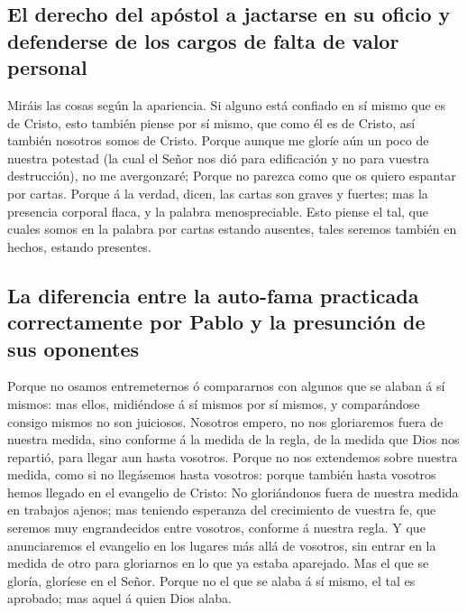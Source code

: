 \hypertarget{el-derecho-del-apuxf3stol-a-jactarse-en-su-oficio-y-defenderse-de-los-cargos-de-falta-de-valor-personal}{%
\subsection{El derecho del apóstol a jactarse en su oficio y defenderse
de los cargos de falta de valor
personal}\label{el-derecho-del-apuxf3stol-a-jactarse-en-su-oficio-y-defenderse-de-los-cargos-de-falta-de-valor-personal}}

 Miráis las cosas según la apariencia. Si alguno está
confiado en sí mismo que es de Cristo, esto también piense por sí mismo,
que como él es de Cristo, así también nosotros somos de Cristo.
 Porque aunque me gloríe aún un poco de nuestra potestad
(la cual el Señor nos dió para edificación y no para vuestra
destrucción), no me avergonzaré;  Porque no parezca como
que os quiero espantar por cartas.  Porque á la verdad,
dicen, las cartas son graves y fuertes; mas la presencia corporal flaca,
y la palabra menospreciable.  Esto piense el tal, que
cuales somos en la palabra por cartas estando ausentes, tales seremos
también en hechos, estando presentes.

\hypertarget{la-diferencia-entre-la-auto-fama-practicada-correctamente-por-pablo-y-la-presunciuxf3n-de-sus-oponentes}{%
\subsection{La diferencia entre la auto-fama practicada correctamente
por Pablo y la presunción de sus
oponentes}\label{la-diferencia-entre-la-auto-fama-practicada-correctamente-por-pablo-y-la-presunciuxf3n-de-sus-oponentes}}

 Porque no osamos entremeternos ó compararnos con algunos
que se alaban á sí mismos: mas ellos, midiéndose á sí mismos por sí
mismos, y comparándose consigo mismos no son juiciosos. 
Nosotros empero, no nos gloriaremos fuera de nuestra medida, sino
conforme á la medida de la regla, de la medida que Dios nos repartió,
para llegar aun hasta vosotros.  Porque no nos extendemos
sobre nuestra medida, como si no llegásemos hasta vosotros: porque
también hasta vosotros hemos llegado en el evangelio de Cristo:
 No gloriándonos fuera de nuestra medida en trabajos
ajenos; mas teniendo esperanza del crecimiento de vuestra fe, que
seremos muy engrandecidos entre vosotros, conforme á nuestra regla.
 Y que anunciaremos el evangelio en los lugares más allá
de vosotros, sin entrar en la medida de otro para gloriarnos en lo que
ya estaba aparejado.  Mas el que se gloría, gloríese en
el Señor.  Porque no el que se alaba á sí mismo, el tal
es aprobado; mas aquel á quien Dios alaba.

